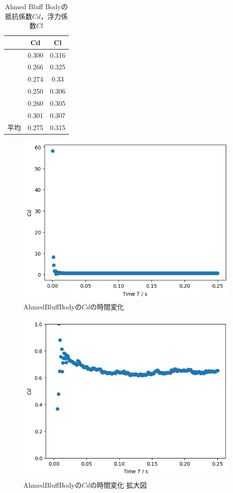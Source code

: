 \begin{table}[htbp]
    \centering
    \caption{Ahmed Bluff Bodyの抵抗係数$Cd$，浮力係数$Cl$}
    \begin{tabular}{ccc}
        \toprule
           & Cd    & Cl    \\
        \midrule
           & 0.300 & 0.316 \\
           & 0.266 & 0.325 \\
           & 0.274 & 0.33  \\
           & 0.250 & 0.306 \\
           & 0.260 & 0.305 \\
           & 0.301 & 0.307 \\
        \midrule
        平均 & 0.275 & 0.315 \\
        \bottomrule
    \end{tabular}%
    \label{tab:ahmed-cd-cl}%
\end{table}%

\begin{figure}[ht]
    \centering
    \includegraphics[width=0.8\linewidth]{figures/ahmed/ahmed-cd.png}
    \caption{AhmedBluffBodyの$Cd$の時間変化}\label{fig:ahmed-cd-t}
\end{figure}

\begin{figure}[ht]
    \centering
    \includegraphics[width=0.8\linewidth]{figures/ahmed/ahmed-cd-0-1.png}
    \caption{AhmedBluffBodyの$Cd$の時間変化 拡大図}\label{fig:ahmed-cd-t-lim}
\end{figure}